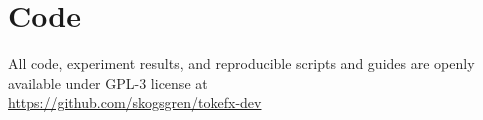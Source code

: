 \chapter{Code}

All code, experiment results, and reproducible scripts and guides are openly available under GPL-3 license at \\
\url{https://github.com/skogsgren/tokefx-dev}
